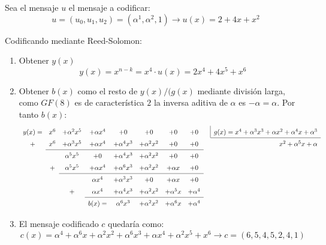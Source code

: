 Sea el mensaje \(u\) el mensaje a codificar:
\begin{equation}
	u=(u_0,u_1,u_2)=(\alpha^1,\alpha^2,1)\rightarrow u(x)=2+4x+x^2
\end{equation}

Codificando mediante Reed-Solomon:
\begin{enumerate}
	\item Obtener \(y(x)\)
	\begin{equation}
		y(x)=x^{n-k}=x^4\cdot u(x)=2x^4+4x^5+x^6
	\end{equation}
	\item Obtener \(b(x)\) como el resto de \(y(x)/(g(x)\) mediante división larga, como \(GF(8)\) es de característica \(2\) la inversa aditiva de $\alpha$ es \(-\alpha=\alpha\). Por tanto $b(x)$:
	\begin{equation}
		\renewcommand{\arraystretch}{1.5}
		\begin{array}{cccccccccr}
			y(x)=&x^6&+\alpha^2x^5&+\alpha x^4&+0&+0&+0&+0 &\kern\arraycolsep\vline\kern-\arraycolsep\hfilneg& g(x)=x^4+\alpha^3x^3+\alpha x^2+\alpha^4 x+\alpha^3\\
			\cline{10-10}
			+&x^6&+\alpha^3x^5&+\alpha x^4&+\alpha^4x^3&+\alpha^2x^2&+0&+0&&x^2+\alpha^5x+\alpha\\
			\cline{2-8}
			&&\alpha^5x^5&+0&+\alpha^4x^3&+\alpha^2x^2&+0&+0&&\\
			&+&\alpha^5x^5&+\alpha x^4&+\alpha^6x^3&+\alpha^2x^2&+\alpha x&+0&&\\
			\cline{3-8}
			&&&\alpha x^4&+\alpha^3x^3&+0&+\alpha x&+0&&\\
			&&+&\alpha x^4&+\alpha^4x^3&+\alpha^2x^2&+\alpha^5x&+\alpha^4&&\\
			\cline{4-8}
			&&&b(x)=&\alpha^6x^3&+\alpha^2x^2&+\alpha^6x&+\alpha^4&&\\
		\end{array}
	\end{equation}
	\item El mensaje codificado \(c\) quedaría como:
	\begin{equation}
		c(x)=\alpha^4+\alpha^6x+\alpha^2x^2+\alpha^6x^3+\alpha x^4+\alpha^2x^5+x^6\rightarrow c=(6,5,4,5,2,4,1)
	\end{equation}
\end{enumerate}

